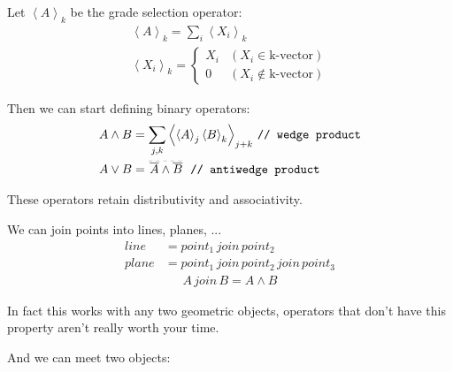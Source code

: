 \documentclass[twoside]{article}
\newcommand{\M}[1]{\scriptstyle{#1}} %
\newcommand{\T}[1]{\textrm{#1}} %
\newcommand{\join}{{\,\M{join}\,}}
\newcommand{\braket}[1]{\left\langle{#1}\right\rangle}
\newcommand{\aside}[1]{\begin{flushright}\scriptsize{#1}\end{flushright}}
\newcommand{\boxedmath}[1]{\begin{center}\boxed{$$#1$$}\end{center}
    }
\newcommand{\overdash}[1]{%
        \tikz[baseline=(todotted.base)]{
            \node[inner sep=1pt,outer sep=0pt] (todotted) {$#1$};
            \draw[dashed, line width=0.05mm] (todotted.north west) -- (todotted.north east);
        }%
    }
\begin{document}
\begin{multicols*}{2}
            \par
                Let $ \braket{A}_k $ be the grade selection operator:
                \begin{gather*}
                    \braket{A}_k = \sum_i \braket{X_i}_k \\
                    \braket{X_i}_k = \begin{cases}
                        X_i & (X_i \in \T{k-vector}) \\
                        0 & (X_i \notin \T{k-vector})
                    \end{cases}
                \end{gather*}
            \par
                Then we can start defining binary operators:
                $$\begin{aligned}
                    A \wedge B &= \sum_{j,k} \braket{\braket{A}_j \braket{B}_k}_{j+k} \, \texttt{// wedge product} \\
                    A \vee B &= \overdash{\overline{A} \wedge \overline{B}} \texttt{ // antiwedge product} %
                \end{aligned}$$
                \aside{These operators retain distributivity and associativity.}
            \par
                We can join points into lines, planes, ...
                \begin{align*}
                    line &= point_1 \join point_2 \\
                    plane &= point_1 \join point_2 \join point_3
                \end{align*} \vspace{-25px}
                \begin{align*}
                    A \join B = A \wedge B
                \end{align*}
                \boxedmath{\begin{aligned}
                    A \join B = A \vee B
                \end{aligned}}
                \aside{In fact this works with any two geometric objects, operators that don't have this property aren't really worth your time.}
            \par
                And we can meet two objects:
                \begin{align*}

\end{align*}
\end{multicols*}
\end{document}

